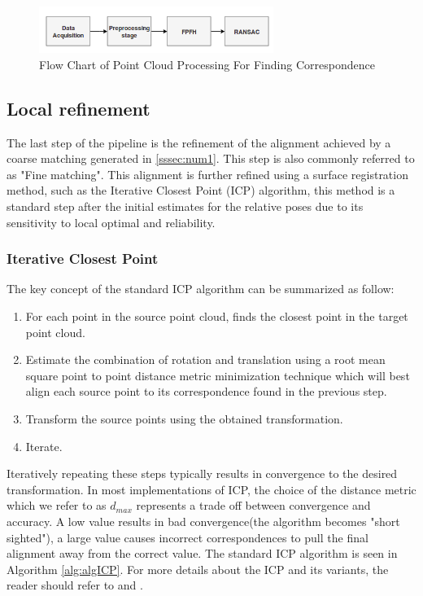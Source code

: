 \begin{figure}[!h]
\begin{center}
\includegraphics[width=3in]{diagrams/ransac.png}
\caption{Flow Chart of Point Cloud Processing For Finding Correspondence}
\label{fig:ransac}
\end{center}
\end{figure}
\subsection{Local refinement}

The last step of the pipeline is the refinement of the alignment achieved by a coarse matching generated in \ref{sssec:num1}. This step is also commonly referred to as "Fine matching". This alignment is further refined using a surface registration method, such as the Iterative Closest Point (ICP) algorithm, this method is a standard step after the initial estimates for the relative poses due to its sensitivity to local optimal and reliability. 

\subsubsection{Iterative Closest Point}

The  key  concept  of  the  standard  ICP  algorithm  can  be summarized as follow:
\begin{enumerate}
    \item For each point in the source point cloud, finds the closest point in the target point cloud.
    \item Estimate the combination of rotation and translation using a root mean square point to point distance metric minimization technique which will best align each source point to its correspondence found in the previous step. 
    \item Transform the source points using the obtained transformation.
    \item Iterate.
\end{enumerate}

Iteratively repeating these steps typically results in convergence to the desired transformation. In most implementations of ICP, the choice of the distance metric which we refer to as $d_{max}$ represents a trade off between convergence and accuracy. A low value results in bad convergence(the algorithm becomes "short sighted"), a large value causes incorrect correspondences to pull the final alignment away from the correct value. The standard ICP algorithm is seen in Algorithm \ref{alg:algICP}. For more details about the ICP and its variants, the reader should refer to \cite{repMatching} and \cite{algIcp}.

